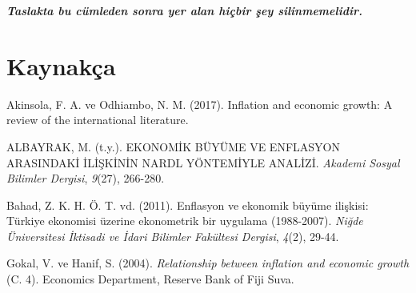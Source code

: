 \documentclass[
  12pt,
]{article}
\newlength{\cslhangindent}
\newlength{\cslentryspacingunit} %
\newenvironment{CSLReferences}[2] %
 {%
  \setlength{\parindent}{0pt}
  \ifodd #1
  \let\oldpar\par
  \def\par{\hangindent=\cslhangindent\oldpar}
  \fi
  \setlength{\parskip}{#2\cslentryspacingunit}
 }%
 {}
\begin{document}
\textbf{\emph{Taslakta bu cümleden sonra yer alan hiçbir şey silinmemelidir.}}

\newpage

\hypertarget{references}{%
\section{Kaynakça}\label{references}}

\hypertarget{refs}{}
\begin{CSLReferences}{1}{0}
\leavevmode{}%
Akinsola, F. A. ve Odhiambo, N. M. (2017). Inflation and economic growth: A review of the international literature.

\leavevmode{}%
ALBAYRAK, M. (t.y.). EKONOM{İ}K B{Ü}Y{Ü}ME VE ENFLASYON ARASINDAK{İ} {İ}L{İ}{Ş}K{İ}N{İ}N NARDL Y{Ö}NTEM{İ}YLE ANAL{İ}Z{İ}. \emph{Akademi Sosyal Bilimler Dergisi}, \emph{9}(27), 266-280.

\leavevmode{}%
Bahad, Z. K. H. Ö. T. vd. (2011). Enflasyon ve ekonomik b{ü}y{ü}me ili{ş}kisi: T{ü}rkiye ekonomisi {ü}zerine ekonometrik bir uygulama (1988-2007). \emph{Ni{ğ}de {Ü}niversitesi {İ}ktisadi ve {İ}dari Bilimler Fak{ü}ltesi Dergisi}, \emph{4}(2), 29-44.

\leavevmode{}%
Gokal, V. ve Hanif, S. (2004). \emph{Relationship between inflation and economic growth} (C. 4). Economics Department, Reserve Bank of Fiji Suva.

\end{CSLReferences}
\end{document}
